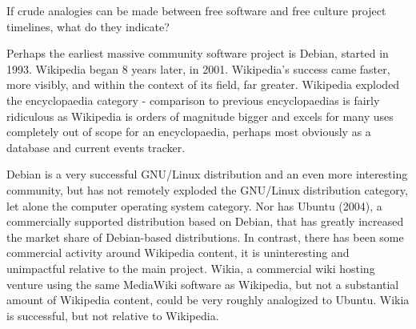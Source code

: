 If crude analogies can be made between free software and free culture project
timelines, what do they indicate?

Perhaps the earliest massive community software project is Debian, started in
1993. Wikipedia began 8 years later, in 2001. Wikipedia's success came faster,
more visibly, and within the context of its f\hbox{}ield, far greater. Wikipedia
exploded the encyclopaedia category - comparison to previous encyclopaedias is
fairly ridiculous as Wikipedia is orders of magnitude bigger and excels for many
uses completely out of scope for an encyclopaedia, perhaps most obviously as a
database and current events tracker.

Debian is a very successful GNU/Linux distribution and an even more interesting
community, but has not remotely exploded the GNU/Linux distribution category,
let alone the computer operating system category. Nor has Ubuntu (2004), a
commercially supported distribution based on Debian, that has greatly increased
the market share of Debian-based distributions. In contrast, there has been some
commercial activity around Wikipedia content, it is uninteresting and
unimpactful relative to the main project. Wikia, a commercial wiki hosting
venture using the same MediaWiki software as Wikipedia, but not a substantial
amount of Wikipedia content, could be very roughly analogized to Ubuntu. Wikia
is successful, but not relative to Wikipedia.
\newpage

